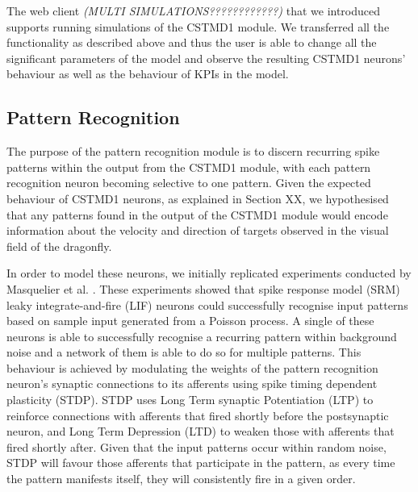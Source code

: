\documentclass[a4paper,11pt]{article}
\begin{document}
The web client \emph{\color{red}(MULTI SIMULATIONS????????????)} that we introduced supports running simulations of the CSTMD1 module. We transferred all the functionality as described above and thus the user is able to change all the significant parameters of the model and observe the resulting CSTMD1 neurons' behaviour as well as the behaviour of KPIs in the model.

\subsection{Pattern Recognition}

The purpose of the pattern recognition module is to discern recurring spike patterns within the output from the CSTMD1 module, with each pattern recognition neuron becoming selective to one pattern. Given the expected behaviour of CSTMD1 neurons, as explained in Section XX, we hypothesised that any patterns found in the output of the CSTMD1 module would encode information about the velocity and direction of targets observed in the visual field of the dragonfly.\par

	In order to model these neurons, we initially replicated experiments conducted by Masquelier et al. \cite{stdp2} \cite{stdp1}. These experiments showed that spike response model (SRM) leaky integrate-and-fire (LIF) neurons could successfully recognise input patterns based on sample input generated from a Poisson process. A single of these neurons is able to successfully recognise a recurring pattern within background noise and a network of them is able to do so for multiple patterns. This behaviour is achieved by modulating the weights of the pattern recognition neuron's synaptic connections to its afferents using spike timing dependent plasticity (STDP). STDP uses Long Term synaptic Potentiation (LTP) to reinforce connections with afferents that fired shortly before the postsynaptic neuron, and Long Term Depression (LTD) to weaken those with afferents that fired shortly after. Given that the input patterns occur within random noise, STDP will favour those afferents that participate in the pattern, as every time the pattern manifests itself, they will consistently fire in a given order.
\end{document}
